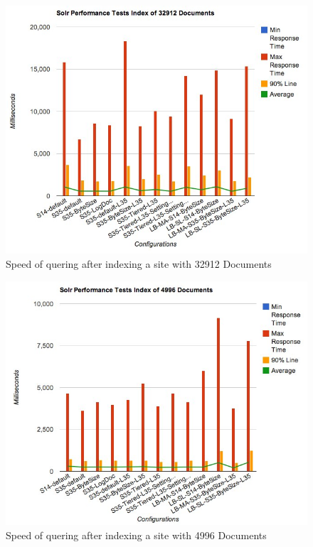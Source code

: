 \begin{figure}
     \includegraphics[width=\textwidth]{images/implementation/big-speed.jpg}
     \caption{Speed of quering after indexing a site with 32912 Documents}
\end{figure}
\begin{figure}
     \includegraphics[width=\textwidth]{images/implementation/small-speed.jpg}
     \caption{Speed of quering after indexing a site with 4996 Documents}
\end{figure}
